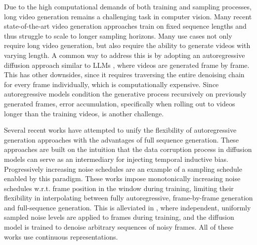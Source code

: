 Due to the high computational demands of both training and sampling processes, long video generation remains a challenging task in computer vision. Many recent state-of-the-art video generation approaches train on fixed sequence lengths \cite{blattmann2023stable,blattmann2023align_videoldm,ho2022video} and thus struggle to scale to longer sampling horizons. Many use cases not only require long video generation, but also require the ability to generate videos with varying length. A common way to address this is by adopting an autoregressive diffusion approach similar to LLMs \cite{gao2024vid}, where videos are generated frame by frame. This has other downsides, since it requires traversing the entire denoising chain for every frame individually, which is computationally expensive. Since autoregressive models condition the generative process recursively on previously generated frames, error accumulation, specifically when rolling out to videos longer than the training videos, is another challenge.
\par
Several recent works \cite{ruhe2024rollingdiffusionmodels, chen2024diffusionforcing} have attempted to unify the flexibility of autoregressive generation approaches with the advantages of full sequence generation. These approaches are built on the intuition that the data corruption process in diffusion models can serve as an intermediary for injecting temporal inductive bias. Progressively increasing noise schedules \cite{xie2024progressive,ruhe2024rollingdiffusionmodels} are an example of a sampling schedule enabled by this paradigm. These works impose monotonically increasing noise schedules w.r.t. frame position in the window during training, limiting their flexibility in interpolating between fully autoregressive, frame-by-frame generation and full-sequence generation. This is alleviated in \cite{chen2024diffusionforcing}, where independent, uniformly sampled noise levels are applied to frames during training, and the diffusion model is trained to denoise arbitrary sequences of noisy frames. All of these works use continuous representations.
\par
